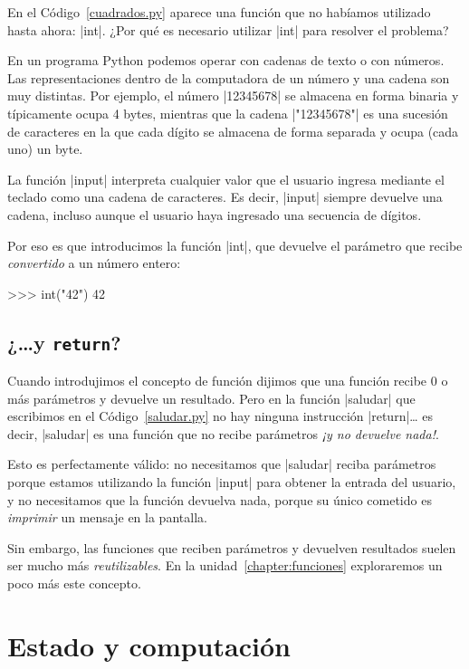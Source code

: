 En el Código~\ref{cuadrados.py} aparece una función que no habíamos
utilizado hasta ahora: |int|. ¿Por qué es necesario utilizar |int| para
resolver el problema?

En un programa Python podemos operar con cadenas de texto o con números.  Las
representaciones dentro de la computadora de un número y una cadena son muy
distintas. Por ejemplo, el número |12345678| se almacena en forma binaria y
típicamente ocupa 4 bytes, mientras que la cadena |"12345678"| es una sucesión
de caracteres en la que cada dígito se almacena de forma separada y ocupa (cada
uno) un byte.

La función |input| interpreta cualquier valor que el usuario ingresa mediante
el teclado como una cadena de caracteres. Es decir, |input| siempre devuelve
una cadena, incluso aunque el usuario haya ingresado una secuencia de dígitos.

Por eso es que introducimos la función |int|, que devuelve el parámetro que
recibe \emph{convertido} a un número entero:

\begin{codigo-python-sn}
>>> int("42")
42
\end{codigo-python-sn}

\subsection*{¿\ldots y \verb|return|?}

Cuando introdujimos el concepto de función dijimos que una función recibe 0 o
más parámetros y devuelve un resultado. Pero en la función |saludar| que
escribimos en el Código~\ref{saludar.py} no hay ninguna instrucción
|return|\ldots
es decir, |saludar| es una función que no recibe parámetros \emph{¡y no devuelve
nada!}.

Esto es perfectamente válido: no necesitamos que |saludar| reciba parámetros
porque estamos utilizando la función |input| para obtener la entrada del
usuario, y no necesitamos que la función devuelva nada, porque su único
cometido es \emph{imprimir} un mensaje en la pantalla.

Sin embargo, las funciones que reciben parámetros y devuelven resultados suelen
ser mucho más \emph{reutilizables}. En la unidad~\ref{chapter:funciones}
exploraremos un poco más este concepto.

%
%
\clearpage

\section{Estado y computación}

